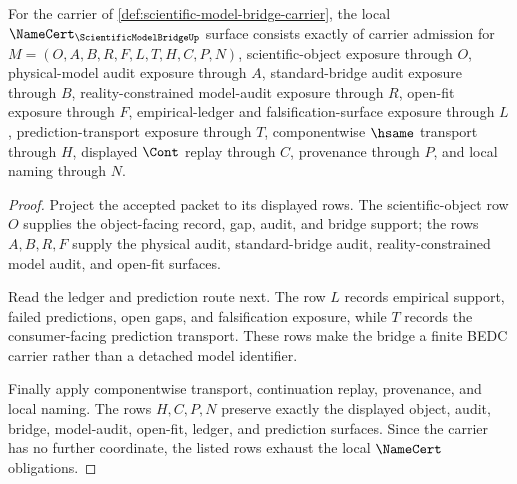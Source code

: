 \begin{theorem}
\label{thm:scientific-model-bridge-namecert-obligations}
For the carrier of \autoref{def:scientific-model-bridge-carrier}, the local $\NameCert_{\ScientificModelBridgeUp}$ surface consists exactly of carrier admission for $M=(O,A,B,R,F,L,T,H,C,P,N)$, scientific-object exposure through $O$, physical-model audit exposure through $A$, standard-bridge audit exposure through $B$, reality-constrained model-audit exposure through $R$, open-fit exposure through $F$, empirical-ledger and falsification-surface exposure through $L$, prediction-transport exposure through $T$, componentwise $\hsame$ transport through $H$, displayed $\Cont$ replay through $C$, provenance through $P$, and local naming through $N$.
\end{theorem}
\begin{proof}
Project the accepted packet to its displayed rows. The scientific-object row $O$ supplies the object-facing record, gap, audit, and bridge support; the rows $A,B,R,F$ supply the physical audit, standard-bridge audit, reality-constrained model audit, and open-fit surfaces.

Read the ledger and prediction route next. The row $L$ records empirical support, failed predictions, open gaps, and falsification exposure, while $T$ records the consumer-facing prediction transport. These rows make the bridge a finite BEDC carrier rather than a detached model identifier.

Finally apply componentwise transport, continuation replay, provenance, and local naming. The rows $H,C,P,N$ preserve exactly the displayed object, audit, bridge, model-audit, open-fit, ledger, and prediction surfaces. Since the carrier has no further coordinate, the listed rows exhaust the local $\NameCert$ obligations.
\end{proof}


